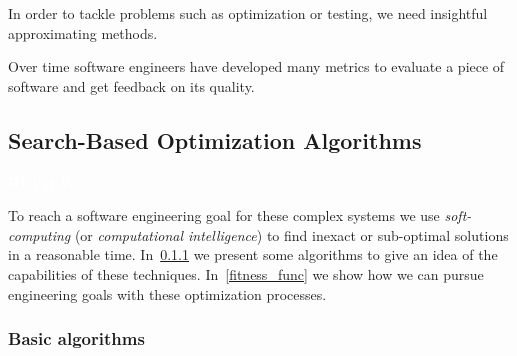 \documentclass[11pt]{sdm}
\newcommand{\review}{\colorbox{YellowOrange!100}{\textcolor{white}{\textbf{REVIEW}}}}
\begin{document}
In order to tackle problems such as optimization or testing, we need insightful approximating methods.

Over time software engineers have developed many metrics to evaluate a piece of software and get feedback on its quality.

\subsection{Search-Based Optimization Algorithms}
\label{example_algo}
\review{}

To reach a software engineering goal for these complex systems we use \textit{soft-computing} (or \textit{computational intelligence}) to find inexact or sub-optimal solutions in a reasonable time.
In~\ref{basic_algo} we present some algorithms to give an idea of the capabilities of these techniques.
In~\ref{fitness_func} we show how we can pursue engineering goals with these optimization processes.

\subsubsection{Basic algorithms}
\label{basic_algo}
\end{document}
